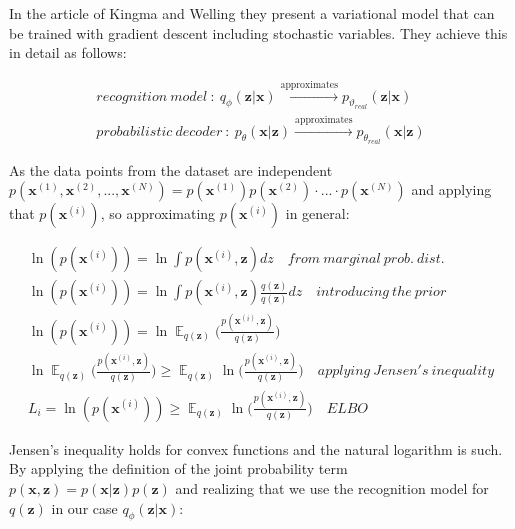 \documentclass[12pt, english]{article}
\DeclareMathOperator*{\E}{\mathbb{E}}
\begin{document}
\par In the article of Kingma and Welling \cite{kingma2013auto} they present a variational model that can be trained with gradient descent including stochastic variables. They achieve this in detail as follows:

\vspace{4mm}

\begin{gather*}
    recognition\ model\ :\  q_{\phi}(\bm{z}|\bm{x}) \xrightarrow{\text{approximates}} p_{\vartheta_{real}}(\bm{z} | \bm{x}) \\
    probabilistic\ decoder\ :\ p_{\theta}(\bm{x} | \bm{z}) \xrightarrow{\text{approximates}} p_{\theta_{real}}(\bm{x} | \bm{z})
\end{gather*}

\vspace{4mm}

\par As the data points from the dataset are independent $p(\bm{x}^{(1)}, \bm{x}^{(2)}, ..., \bm{x}^{(N)}) = p(\bm{x}^{(1)})p(\bm{x}^{(2)})\cdot ... \cdot p(\bm{x}^{(N)})$ and applying that $p(\bm{x}^{(i)})$, so approximating $p(\bm{x}^{(i)})$ in general:

\vspace{4mm}

\begin{gather}
    \ln(p(\bm{x}^{(i)})) = \ln\int p(\bm{x}^{(i)}, \bm{z})dz \quad from\ marginal\ prob.\ dist.\\
    \ln(p(\bm{x}^{(i)})) = \ln\int p(\bm{x}^{(i)}, \bm{z})\frac{q(\bm{z})}{q(\bm{z})}dz \quad introducing\ the\ prior \\
    \ln(p(\bm{x}^{(i)})) = \ln \E_{q(\bm{z})} \Big( \frac{p(\bm{x}^{(i)}, \bm{z})}{q(\bm{z})}\Big) \\
    \ln \E_{q(\bm{z})} \Big( \frac{p(\bm{x}^{(i)}, \bm{z})}{q(\bm{z})}\Big) \geq \E_{q(\bm{z})} \ln\Big( \frac{p(\bm{x}^{(i)}, \bm{z})}{q(\bm{z})}\Big) \quad applying\ Jensen's\ inequality \\
    L_{i} = \ln(p(\bm{x}^{(i)})) \geq \E_{q(\bm{z})} \ln\Big( \frac{p(\bm{x}^{(i)}, \bm{z})}{q(\bm{z})}\Big) \quad ELBO
\end{gather}

\vspace{4mm}

\par Jensen's inequality holds for convex functions and the natural logarithm is such. By applying the definition of the joint probability term $p(\bm{x}, \bm{z}) = p(\bm{x} | \bm{z})p(\bm{z})$ and realizing that we use the recognition model for $q(\bm{z})$ in our case $q_{\phi}(\bm{z} | \bm{x})$:
\end{document}
